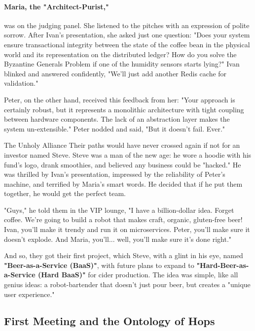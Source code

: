 \paragraph{Maria, the "Architect-Purist,"} was on the judging panel. She listened to the pitches with an expression of polite sorrow. After Ivan's presentation, she asked just one question: "Does your system ensure transactional integrity between the state of the coffee bean in the physical world and its representation on the distributed ledger? How do you solve the Byzantine Generals Problem if one of the humidity sensors starts lying?" Ivan blinked and answered confidently, "We'll just add another Redis cache for validation."

Peter, on the other hand, received this feedback from her: "Your approach is certainly robust, but it represents a monolithic architecture with tight coupling between hardware components. The lack of an abstraction layer makes the system un-extensible." Peter nodded and said, "But it doesn't fail. Ever."

\begin{tipbox}{The Unholy Alliance}
Their paths would have never crossed again if not for an investor named Steve. Steve was a man of the new age: he wore a hoodie with his fund's logo, drank smoothies, and believed any business could be "hacked." He was thrilled by Ivan's presentation, impressed by the reliability of Peter's machine, and terrified by Maria's smart words. He decided that if he put them together, he would get the perfect team.
\end{tipbox}

"Guys," he told them in the VIP lounge, "I have a billion-dollar idea. Forget coffee. We're going to build a robot that makes craft, organic, gluten-free beer! Ivan, you'll make it trendy and run it on microservices. Peter, you'll make sure it doesn't explode. And Maria, you'll... well, you'll make sure it's done right."

And so, they got their first project, which Steve, with a glint in his eye, named \textbf{"Beer-as-a-Service (BaaS)"}, with future plans to expand to \textbf{"Hard-Beer-as-a-Service (Hard BaaS)"} for cider production. The idea was simple, like all genius ideas: a robot-bartender that doesn't just pour beer, but creates a "unique user experience."

\subsection*{First Meeting and the Ontology of Hops}
\label{sec:parable_first_meeting}


